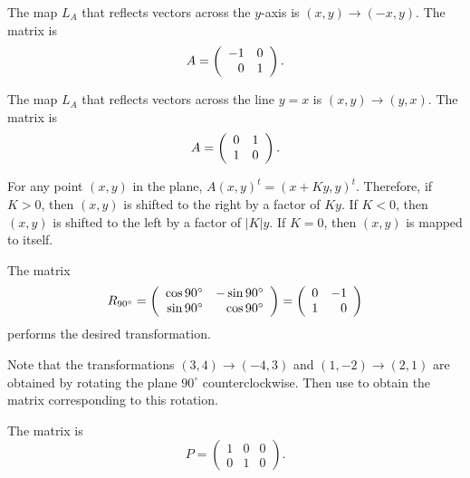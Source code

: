 \documentclass{ximera}
\begin{document}
 The map $L_A$ that reflects vectors across the $y$-axis is
$(x,y) \rightarrow (-x,y)$.  The matrix is
\[
A = \left(\begin{array}{rr} -1 & 0\\ 0 &1\end{array}\right).
\]

 The map $L_A$ that reflects vectors across the line $y=x$ is
$(x,y) \rightarrow (y,x)$.  The matrix is
\[
A = \left(\begin{array}{rr} 0 & 1\\ 1 &0\end{array}\right).
\]

For any point $(x,y)$ in the plane, $A(x,y)^t = (x + Ky,y)^t$.  Therefore,
if $K > 0$, then $(x,y)$ is shifted to the right by a factor of $Ky$.  If
$K < 0$, then $(x,y)$ is shifted to the left by a factor of $|K|y$.  If
$K = 0$, then $(x,y)$ is mapped to itself.

\ans The matrix
\[ R_{90^\circ} = \left(\begin{array}{rr} \cos{90^\circ} & -\sin{90^\circ}\\ \sin{90^\circ} &\cos{90^\circ}\end{array}\right) = \left(\begin{array}{rr} 0 & -1\\ 1 &0\end{array}\right) \]
performs the desired transformation.

\soln Note that the transformations $(3,4) \rightarrow (-4,3)$ and
$(1,-2) \rightarrow (2,1)$ are obtained by rotating the plane
$90^\circ$ counterclockwise.  Then use  to obtain the
matrix corresponding to this rotation.

\ans The matrix is
\[ P = \left(\begin{array}{rrr} 1 & 0 & 0 \\ 0 & 1 & 0\end{array}\right). \]
\end{document}
